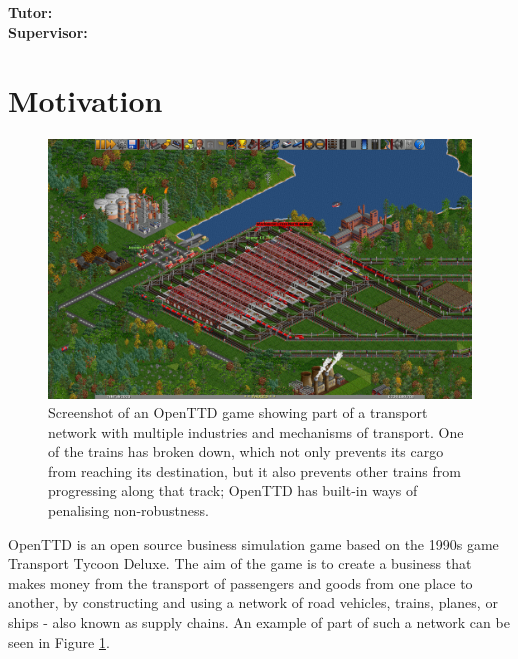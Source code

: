 \documentclass[a4paper,11pt]{article}
\begin{document}
\vfill
{\bf Tutor:} \tutor\\
{\bf Supervisor:} \supervisor
\newpage

\setcounter{page}{1}                            %
\footruleheight{1pt}
\headruleheight{1pt}
\rhead{- \thepage}
\cfoot{}
%


\section{Motivation}

\begin{figure}[h]
\centering
\includegraphics[width=\textwidth]{transport-tycoon-screenshot.png}
\caption{Screenshot of an OpenTTD game showing part of a transport network with multiple industries and mechanisms of transport. One of the trains has broken down, which not only prevents its cargo from reaching its destination, but it also prevents other trains from progressing along that track; OpenTTD has built-in ways of penalising non-robustness.}
\label{fig:network}
\end{figure}

OpenTTD is an open source business simulation game based on the 1990s game Transport Tycoon Deluxe. The aim of the game is to create a business that makes money from the transport of passengers and goods from one place to another, by constructing and using a network of road vehicles, trains, planes, or ships - also known as supply chains. An example of part of such a network can be seen in Figure \ref{fig:network}.
\end{document}
